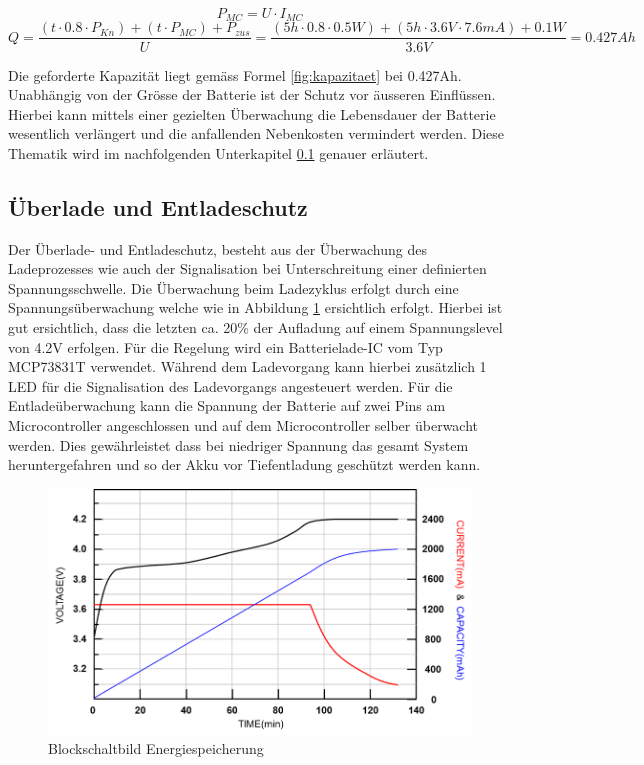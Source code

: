 \begin{equation}
P_{MC}=U\cdot I_{MC}
\label{fig:LeistungMC}
\end{equation}
\begin{equation}
Q=\frac{\left(t\cdot 0.8\cdot P_{Kn}\right)+\left(t\cdot P_{MC}\right)+P_{zus}}{U}=\frac{\left(5h\cdot 0.8\cdot 0.5W\right)+\left(5h\cdot 3.6V\cdot 7.6mA\right)+0.1W}{3.6V}=0.427Ah
\label{fig:kapazitaet}
\end{equation}

Die geforderte Kapazität liegt gemäss Formel \ref{fig:kapazitaet} bei 0.427Ah. Unabhängig von der Grösse der Batterie ist der Schutz vor äusseren Einflüssen. Hierbei kann mittels einer gezielten Überwachung die Lebensdauer der Batterie wesentlich verlängert und die anfallenden Nebenkosten vermindert werden. Diese Thematik wird im nachfolgenden Unterkapitel \ref{Überlade und Entladeschutz} genauer erläutert.
                                         
\subsection{Überlade und Entladeschutz}  \label{Überlade und Entladeschutz}

Der Überlade- und Entladeschutz, besteht aus der Überwachung des Ladeprozesses wie auch der Signalisation bei Unterschreitung einer definierten Spannungsschwelle. Die Überwachung beim Ladezyklus erfolgt durch eine Spannungsüberwachung welche wie in Abbildung \ref{fig:Ladekurve Li-Ion Akku} ersichtlich erfolgt. Hierbei ist gut ersichtlich, dass die letzten ca. 20\% der Aufladung auf einem Spannungslevel von 4.2V erfolgen. Für die Regelung wird ein Batterielade-IC vom Typ MCP73831T verwendet.
Während dem Ladevorgang kann hierbei zusätzlich 1 LED für die Signalisation des Ladevorgangs angesteuert werden. Für die Entladeüberwachung kann die Spannung der Batterie auf zwei Pins am Microcontroller angeschlossen und auf dem Microcontroller selber überwacht werden. Dies gewährleistet dass bei niedriger Spannung das gesamt System heruntergefahren und so der Akku vor Tiefentladung geschützt werden kann.

\begin{figure}[H]
	\begin{center}
		\includegraphics[width=120mm]{data/LadekurveLiIon.png}
		\caption{Blockschaltbild Energiespeicherung} %
		\label{fig:Ladekurve Li-Ion Akku}
	\end{center}
\end{figure}
